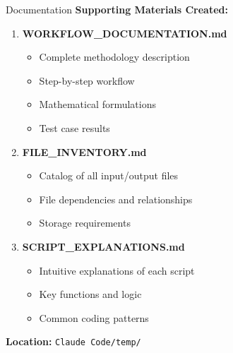 \documentclass[10pt]{beamer}
\begin{document}
\begin{frame}{Documentation}
\textbf{Supporting Materials Created:}

\vspace{0.3cm}

\begin{enumerate}
    \item \textbf{WORKFLOW\_DOCUMENTATION.md}
    \begin{itemize}
        \item Complete methodology description
        \item Step-by-step workflow
        \item Mathematical formulations
        \item Test case results
    \end{itemize}

    \vspace{0.2cm}

    \item \textbf{FILE\_INVENTORY.md}
    \begin{itemize}
        \item Catalog of all input/output files
        \item File dependencies and relationships
        \item Storage requirements
    \end{itemize}

    \vspace{0.2cm}

    \item \textbf{SCRIPT\_EXPLANATIONS.md}
    \begin{itemize}
        \item Intuitive explanations of each script
        \item Key functions and logic
        \item Common coding patterns
    \end{itemize}
\end{enumerate}

\vspace{0.3cm}

\textbf{Location:} \texttt{Claude Code/temp/}
\end{frame}
\end{document}
